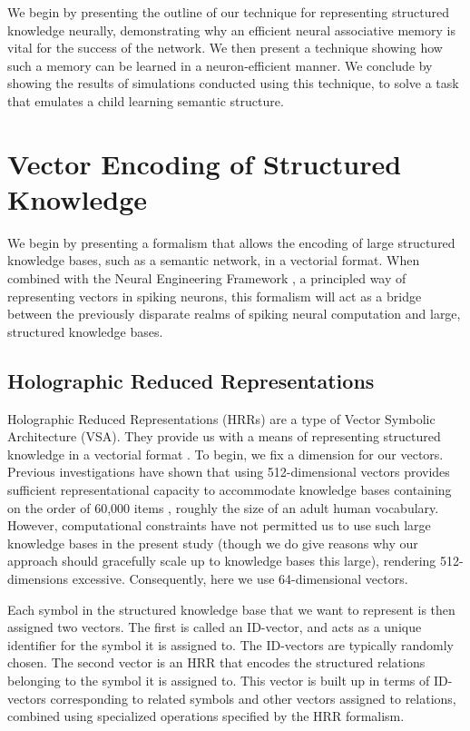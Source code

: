 \documentclass[10pt,letterpaper]{article}
\begin{document}
We begin by presenting the outline of our technique for representing structured knowledge neurally, demonstrating why  an efficient neural associative memory is vital for the success of the network. We then present a technique showing how such a memory can be learned in a neuron-efficient manner. We conclude by showing the results of simulations conducted using this technique, to solve a task that emulates a child learning semantic structure.

\section{Vector Encoding of Structured Knowledge}
We begin by presenting a formalism that allows the encoding of large structured knowledge bases, such as a semantic network, in a vectorial format. When combined with the Neural Engineering Framework \citep{Eliasmith2003m}, a principled way of representing vectors in spiking neurons, this formalism will act as a bridge between the previously disparate realms of spiking neural computation and large, structured knowledge bases.

\subsection{Holographic Reduced Representations}
Holographic Reduced Representations (HRRs) are a type of Vector Symbolic Architecture (VSA). They provide us with a means of representing structured knowledge in a vectorial format \citep{Plate2003d}.  To begin, we fix a dimension for our vectors. 
Previous investigations have shown that using 512-dimensional vectors provides sufficient representational capacity to accommodate knowledge bases containing on the order of 60,000 items \citep{Eliasmith2012}, roughly the size of an adult human vocabulary. However, computational constraints have not permitted us to use such large knowledge bases in the present study (though we do give reasons why our approach should gracefully scale up to knowledge bases this large), rendering 512-dimensions excessive. Consequently, here we use 64-dimensional vectors. 

Each symbol in the structured knowledge base that we want to represent is then assigned two vectors. The first is called an ID-vector, and acts as a unique identifier for the symbol it is assigned to. The ID-vectors are typically randomly chosen. The second vector is an HRR that encodes the structured relations belonging to the symbol it is assigned to. This vector is built up in terms of ID-vectors corresponding to related symbols and other vectors assigned to relations, combined using specialized operations specified by the HRR formalism.
\end{document}
